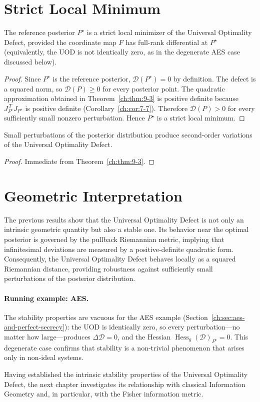 \section{Strict Local Minimum}\label{ch:sec:strict-local-minimum}
\begin{theorem}
\label{ch:thm:9-4}
The reference posterior
$P^\star$
is a strict local minimizer of the Universal Optimality Defect,
provided the coordinate map \(F\) has full-rank differential at \(P^\star\)
(equivalently, the UOD is not identically zero, as in the degenerate
AES case discussed below).
\end{theorem}
\begin{proof}
Since $P^\star$ is the reference posterior, $\mathcal D(P^\star)=0$ by definition.
The defect is a squared norm, so $\mathcal D(P)\ge0$
for every posterior point.
The quadratic approximation obtained in Theorem~\ref{ch:thm:9-3} is positive definite because
$J_{P^\star}^{\,T}J_{P^\star}$
is positive definite (Corollary~\ref{ch:cor:7-7}).
Therefore
$\mathcal D(P)>0$
for every sufficiently small nonzero perturbation.
Hence
$P^\star$
is a strict local minimum. 
\end{proof}
\begin{corollary}\label{ch:cor:9-5}

Small perturbations of the posterior distribution produce second-order variations of the Universal Optimality Defect.
\end{corollary}
\begin{proof}
Immediate from Theorem~\ref{ch:thm:9-3}. 
\end{proof}

\section{Geometric Interpretation}
The previous results show that the Universal Optimality Defect is not only an intrinsic geometric quantity but also a stable one.
Its behavior near the optimal posterior is governed by the pullback Riemannian metric, implying that infinitesimal deviations are measured by a positive-definite quadratic form.
Consequently, the Universal Optimality Defect behaves locally as a squared Riemannian distance, providing robustness against sufficiently small perturbations of the posterior distribution.
\paragraph{Running example: AES.}
The stability properties are vacuous for the AES example (Section~\ref{ch:sec:aes-and-perfect-secrecy}): the UOD is identically zero, so every perturbation---no matter how large---produces $\Delta\mathcal D=0$, and the Hessian $\operatorname{Hess}_g(\mathcal D)_{P^\star}=0$.  This degenerate case confirms that stability is a non-trivial phenomenon that arises only in non-ideal systems.

Having established the intrinsic stability properties of the Universal Optimality Defect, the next chapter investigates its relationship with classical Information Geometry and, in particular, with the Fisher information metric.
